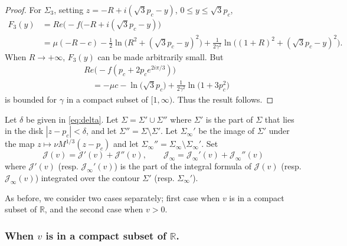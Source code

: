 \documentclass[11pt]{article}
\begin{document}
\begin{proof}
For $\Sigma_3$, setting $z=-R+i(\sqrt{3}p_c-y)$,  $0\le y\le
\sqrt{3}p_c$,
\begin{equation}
\begin{split}
  F_3(y) &= Re\bigl(-f (-R+i(\sqrt{3} p_c -y)\bigr) \\
  &=  \mu(-R-c) - \frac12 \ln\bigl( R^2+(\sqrt{3}p_c-y)^2\bigr)
  + \frac1{2\gamma^2} \ln\bigr( (1+R)^2+(\sqrt{3} p_c-y)^2\bigr).
\end{split}
\end{equation}
When $R\to +\infty$, $F_3(y)$ can be made arbitrarily small. But
\begin{equation}
\begin{split}
   & Re \bigl(-f(p_c+2p_c e^{2i\pi/3})\bigr) \\
   &\quad =  -\mu c - \ln\bigl( \sqrt{3} p_c \bigr)
   + \frac1{2\gamma^2} \ln \bigl(1+3 p_c^2\bigr)
\end{split}
\end{equation}
is bounded for $\gamma$ in a compact subset of $[1,\infty)$. Thus
the result follows.
\end{proof}




Let $\delta$ be given in \eqref{eq:delta}.
Let $\Sigma=\Sigma'\cup\Sigma''$ where $\Sigma'$ is the part of $\Sigma$
that lies in the disk $|z-p_c|<\delta$,
and let $\Sigma''=\Sigma\setminus \Sigma'$. Let $\Sigma_\infty'$ be the image
of $\Sigma'$ under the map $z\mapsto \nu M^{1/3}(z-p_c)$
and let $\Sigma_\infty'' = \Sigma_\infty\setminus \Sigma_\infty'$. Set
\begin{equation}
  \mathcal{J}(v)=\mathcal{J}'(v) + \mathcal{J}''(v),
\qquad \mathcal{J}_\infty=\mathcal{J}_\infty'(v) + \mathcal{J}_\infty''(v)
\end{equation}
where $\mathcal{J}'(v)$ (resp. $\mathcal{J}_\infty'(v)$) is the part of
the integral formula of $\mathcal{J}(v)$ (resp. $\mathcal{J}_\infty(v)$)
integrated over the contour $\Sigma'$ (resp. $\Sigma_\infty'$).


As before, we consider two cases separately; first case when $v$ is in
a compact subset of $\mathbb{R}$, and the second case when $v>0$.




\subsubsection{When $v$ is in a compact subset of $\mathbb{R}$.}
\end{document}

